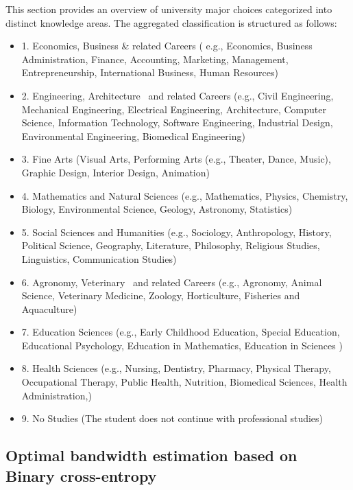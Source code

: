 This section provides an overview of university major choices categorized into distinct knowledge areas. The aggregated classification is structured as follows:
    \begin{itemize}
        \item 1. Economics, Business \& related Careers ( e.g., Economics, Business Administration, Finance, Accounting, Marketing, Management, Entrepreneurship, International Business, Human Resources)
        \item 2. Engineering, Architecture \ and related Careers (e.g., Civil Engineering, Mechanical Engineering, Electrical Engineering, Architecture, Computer Science, Information Technology, Software Engineering, Industrial Design, Environmental Engineering, Biomedical Engineering)
        \item 3. Fine Arts (Visual Arts, Performing Arts (e.g., Theater, Dance, Music), Graphic Design, Interior Design, Animation)
        \item 4. Mathematics and Natural Sciences (e.g., Mathematics, Physics, Chemistry, Biology, Environmental Science, Geology, Astronomy, Statistics)
        \item 5. Social Sciences and Humanities (e.g.,  Sociology, Anthropology, History, Political Science, Geography, Literature, Philosophy, Religious Studies, Linguistics, Communication Studies)
        \item 6. Agronomy, Veterinary \ and related Careers (e.g., Agronomy, Animal Science, Veterinary Medicine, Zoology, Horticulture, Fisheries and Aquaculture)
        \item 7. Education Sciences (e.g.,  Early Childhood Education, Special Education, Educational Psychology, Education in Mathematics, Education in Sciences ) 
        \item 8. Health Sciences (e.g.,  Nursing, Dentistry, Pharmacy, Physical Therapy, Occupational Therapy, Public Health, Nutrition, Biomedical Sciences, Health Administration,)
        \item 9. No Studies (The student does not continue with professional studies)
    \end{itemize}


\newpage
 \subsection{Optimal bandwidth estimation based on Binary cross-entropy }
 \label{bce}

